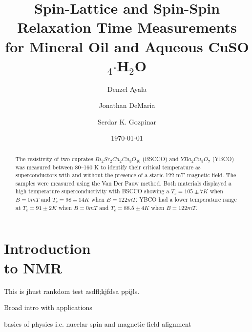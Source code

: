 \documentclass[
reprint,
amsmath,amssymb,
aps,
tikz,
border=5pt
]{revtex4-1}
\begin{document}

\title{Spin-Lattice and Spin-Spin Relaxation Time Measurements \\ for Mineral Oil and Aqueous CuSO$_{4} \boldsymbol{\cdot} $H$_2$O}

\author{Denzel Ayala} 
\author{Jonathan DeMaria}
\author{Serdar K. Gozpinar}

%


\date{\today}%

\begin{abstract}

The resistivity of two cuprates $Bi_2Sr_2Ca_{2}Cu_3O_{10}$ (BSCCO) and $YBa_2Cu_3O_7$ (YBCO) was measured between 80--160 K to identify their critical temperature as superconductors with and without the presence of a static 122 mT magnetic field. The samples were measured using the Van Der Pauw method. Both materials displayed a high temperature superconductivity with BSCCO showing a $ T_c = 105\pm 7 K$ when $B=0 mT$ and $T_c = 98\pm 14 K$ when $B=122 mT$. YBCO had a lower temperature range at $T_c = 91\pm 2 K$ when $B=0 mT$ and $T_c = 88.5\pm 4 K$ when $B=122 mT$.

\end{abstract}

\maketitle

\section*{\label{sec:intro}Introduction \\\lowercase{to} NMR}

  This is jhust rankdom test asdfl;kjfdsa ppijls.~\cite{ashcroft76}


  Broad intro with applications

  basics of physics i.e. nucelar spin and magnetic field alignment
\end{document}
